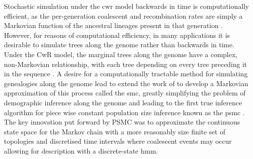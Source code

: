 Stochastic simulation under the \gls{cwr} model backwards in time is computationally efficient, as the per-generation coalescent and recombination rates are simply a Markovian function of the ancestral lineages present in that generation \cite{RR1983}. However, for reasons of computational efficiency, in many applications it is desirable to simulate trees along the genome rather than backwards in time. Under the CwR model, the marginal trees along the genome have a complex, non-Markovian relationship, with each tree depending on every tree preceding it in the sequence \cite{C1999}. A desire for a computationally tractable method for simulating genealogies along the genome lead \textcite{McVean2005a} to extend the work of \textcite{C1999} to develop a Markovian approximation of this process called the \gls{smc}, greatly simplifying the problem of demographic inference along the genome and leading to the first true inference algorithm for piece wise constant population size inference known as the \gls{psmc} \cite{Li2011a}. The key innovation put forward by PSMC was to approximate the continuous state space for the Markov chain with a more reasonably size finite set of topologies and discretised time intervals where coalescent events may occur allowing for description with a discrete-state \gls{hmm}. 
